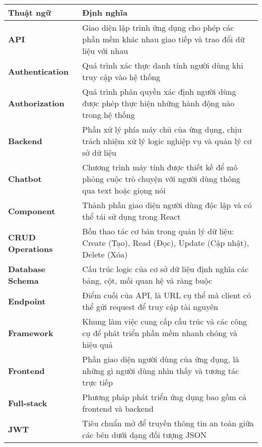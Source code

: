 \documentclass[../DoAn.tex]{subfiles}
\begin{document}
\begin{tabular}{p{3.5cm} p{10.5cm}}
	\textbf{Thuật ngữ}  & \textbf{Định nghĩa} \\ 
	\hline
	\textbf{API} & Giao diện lập trình ứng dụng cho phép các phần mềm khác nhau giao tiếp và trao đổi dữ liệu với nhau \\
	\textbf{Authentication} & Quá trình xác thực danh tính người dùng khi truy cập vào hệ thống \\
	\textbf{Authorization} & Quá trình phân quyền xác định người dùng được phép thực hiện những hành động nào trong hệ thống \\
	\textbf{Backend} & Phần xử lý phía máy chủ của ứng dụng, chịu trách nhiệm xử lý logic nghiệp vụ và quản lý cơ sở dữ liệu \\
	\textbf{Chatbot} & Chương trình máy tính được thiết kế để mô phỏng cuộc trò chuyện với người dùng thông qua text hoặc giọng nói \\
	\textbf{Component} & Thành phần giao diện người dùng độc lập và có thể tái sử dụng trong React \\
	\textbf{CRUD Operations} & Bốn thao tác cơ bản trong quản lý dữ liệu: Create (Tạo), Read (Đọc), Update (Cập nhật), Delete (Xóa) \\
	\textbf{Database Schema} & Cấu trúc logic của cơ sở dữ liệu định nghĩa các bảng, cột, mối quan hệ và ràng buộc \\
	\textbf{Endpoint} & Điểm cuối của API, là URL cụ thể mà client có thể gửi request để truy cập tài nguyên \\
	\textbf{Framework} & Khung làm việc cung cấp cấu trúc và các công cụ để phát triển phần mềm nhanh chóng và hiệu quả \\
	\textbf{Frontend} & Phần giao diện người dùng của ứng dụng, là những gì người dùng nhìn thấy và tương tác trực tiếp \\
	\textbf{Full-stack} & Phương pháp phát triển ứng dụng bao gồm cả frontend và backend \\
	\textbf{JWT} & Tiêu chuẩn mở để truyền thông tin an toàn giữa các bên dưới dạng đối tượng JSON \\
\end{tabular}

\vspace{0.5cm}
\end{document}
